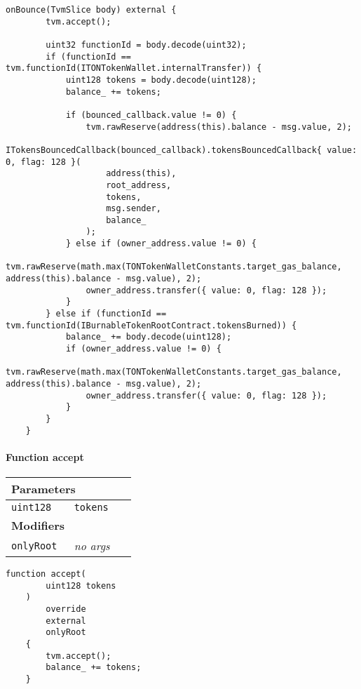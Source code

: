 \begin{lstlisting}[firstnumber=653]
    onBounce(TvmSlice body) external {
        tvm.accept();

        uint32 functionId = body.decode(uint32);
        if (functionId == tvm.functionId(ITONTokenWallet.internalTransfer)) {
            uint128 tokens = body.decode(uint128);
            balance_ += tokens;

            if (bounced_callback.value != 0) {
                tvm.rawReserve(address(this).balance - msg.value, 2);
                ITokensBouncedCallback(bounced_callback).tokensBouncedCallback{ value: 0, flag: 128 }(
                    address(this),
                    root_address,
                    tokens,
                    msg.sender,
                    balance_
                );
            } else if (owner_address.value != 0) {
                tvm.rawReserve(math.max(TONTokenWalletConstants.target_gas_balance, address(this).balance - msg.value), 2);
                owner_address.transfer({ value: 0, flag: 128 });
            }
        } else if (functionId == tvm.functionId(IBurnableTokenRootContract.tokensBurned)) {
            balance_ += body.decode(uint128);
            if (owner_address.value != 0) {
                tvm.rawReserve(math.max(TONTokenWalletConstants.target_gas_balance, address(this).balance - msg.value), 2);
                owner_address.transfer({ value: 0, flag: 128 });
            }
        }
    }
\end{lstlisting}

\paragraph{Function accept}


\ifsoltables
\noindent\begin{tabular}{|l|l|p{5cm}|}\hline
\multicolumn{3}{|l|}{\bf Parameters}\\\hline
\tt uint128 & \tt tokens &\\\hline
\multicolumn{3}{|l|}{\bf Modifiers}\\\hline
\tt onlyRoot & {\em no args} &\\\hline
\end{tabular}
\fi

\vspace{2cm}

\begin{lstlisting}[firstnumber=96]
    function accept(
        uint128 tokens
    )
        override
        external
        onlyRoot
    {
        tvm.accept();
        balance_ += tokens;
    }
\end{lstlisting}

